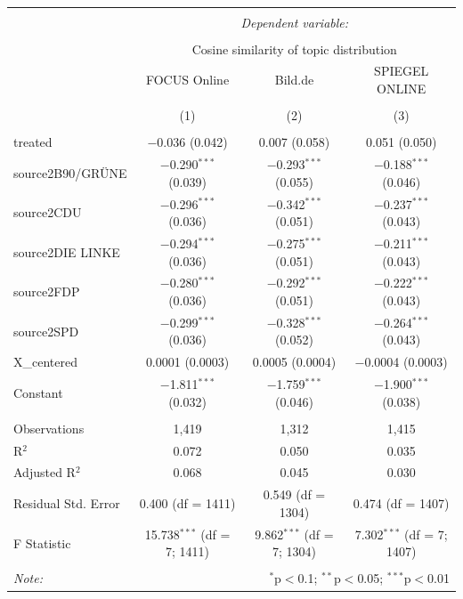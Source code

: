\documentclass[
]{article}
\begin{document}
\begin{table}[!htbp] \centering 
  \caption{} 
  \label{} 
\tiny 
\begin{tabular}{@{\extracolsep{5pt}}lccc} 
\\[-1.8ex]\hline 
\hline \\[-1.8ex] 
 & \multicolumn{3}{c}{\textit{Dependent variable:}} \\ 
\cline{2-4} 
\\[-1.8ex] & \multicolumn{3}{c}{Cosine similarity of topic distribution} \\ 
 & FOCUS Online & Bild.de & SPIEGEL ONLINE \\ 
\\[-1.8ex] & (1) & (2) & (3)\\ 
\hline \\[-1.8ex] 
 treated & $-$0.036 (0.042) & 0.007 (0.058) & 0.051 (0.050) \\ 
  source2B90/GRÜNE & $-$0.290$^{***}$ (0.039) & $-$0.293$^{***}$ (0.055) & $-$0.188$^{***}$ (0.046) \\ 
  source2CDU & $-$0.296$^{***}$ (0.036) & $-$0.342$^{***}$ (0.051) & $-$0.237$^{***}$ (0.043) \\ 
  source2DIE LINKE & $-$0.294$^{***}$ (0.036) & $-$0.275$^{***}$ (0.051) & $-$0.211$^{***}$ (0.043) \\ 
  source2FDP & $-$0.280$^{***}$ (0.036) & $-$0.292$^{***}$ (0.051) & $-$0.222$^{***}$ (0.043) \\ 
  source2SPD & $-$0.299$^{***}$ (0.036) & $-$0.328$^{***}$ (0.052) & $-$0.264$^{***}$ (0.043) \\ 
  X\_centered & 0.0001 (0.0003) & 0.0005 (0.0004) & $-$0.0004 (0.0003) \\ 
  Constant & $-$1.811$^{***}$ (0.032) & $-$1.759$^{***}$ (0.046) & $-$1.900$^{***}$ (0.038) \\ 
 \hline \\[-1.8ex] 
Observations & 1,419 & 1,312 & 1,415 \\ 
R$^{2}$ & 0.072 & 0.050 & 0.035 \\ 
Adjusted R$^{2}$ & 0.068 & 0.045 & 0.030 \\ 
Residual Std. Error & 0.400 (df = 1411) & 0.549 (df = 1304) & 0.474 (df = 1407) \\ 
F Statistic & 15.738$^{***}$ (df = 7; 1411) & 9.862$^{***}$ (df = 7; 1304) & 7.302$^{***}$ (df = 7; 1407) \\ 
\hline 
\hline \\[-1.8ex] 
\textit{Note:}  & \multicolumn{3}{r}{$^{*}$p$<$0.1; $^{**}$p$<$0.05; $^{***}$p$<$0.01} \\ 
\end{tabular} 
\end{table}
\end{document}

